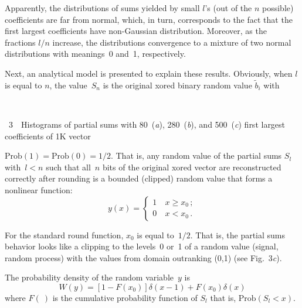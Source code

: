 \begin{multicols}{2}
Apparently, the distributions of sums yielded by small $l$'s (out of the
$n$ possible) coefficients are far from normal, which, in turn, corresponds to the fact that the first largest coefficients
have non-Gaussian distribution. Moreover, as the fractions $l/n$ increase, the distributions convergence
 to a mixture of two normal distributions with meanings~0 and~1, respectively.
 
 Next,  an analytical model is presented to explain these results.
Obviously, when $l$ is equal to $n$, the value~$S_n$ is the original xored
binary random value  $\tilde b_i$ with\linebreak\vspace*{-12pt}

\pagebreak

 \vspace*{-6pt}
\begin{center}  %
 \mbox{%
 \epsfxsize=74.413mm
 }
 \end{center}
{{\figurename~3}\ \ \small{Histograms of partial sums with 80~(\textit{a}), 280~(\textit{b}),
  and 500~(\textit{c}) first largest coefficients  of 1K vector}}




\vspace*{18pt}

\addtocounter{figure}{1}




\noindent
 $\mathrm{Prob}\left(1\right) = \mathrm{Prob}\left(0\right) = 1/2$. That is,
 any random value of the
partial sums $S_l$ with~$l<n$ such that all~$n$ bits of the
original xored vector
are reconstructed correctly after rounding is a bounded (clipped) random value that
forms a nonlinear function:
$$
y(x) = \begin{cases}
1 & \  x \ge x_0\,;\\
0 & \ x<x_0\,.
\end{cases}
$$

For the standard round function, $x_0$ is equal to~$1/2$.
   That is,  the  partial sums  behavior looks like  a clipping  to the levels~0 or~1 
   of a random value (signal, random  process) with the values from domain  outranking 
   (0,1) (see Fig.~3\textit{c}).

The probability density of the random variable~$y$ is
$$
W(y)=[1- F (x_0)] \delta(x-1) +F(x_0) \delta(x)
$$
where $F(\ )$ is the cumulative probability function of $S_l$ that is,
 $\mathrm{Prob}\left(S_l<x\right)$.


\end{multicols}
